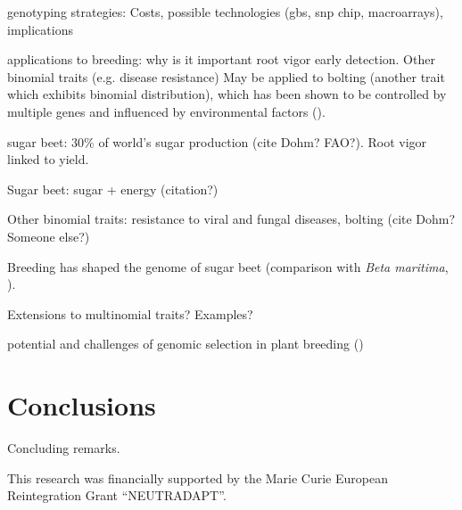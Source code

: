 genotyping strategies: 
Costs, possible technologies (gbs, snp chip, macroarrays), implications

applications to breeding:
why is it important root vigor early detection. Other binomial traits (e.g.
disease resistance) May be applied to bolting (another trait which
exhibits binomial distribution), which has been shown to be controlled
by multiple genes and influenced by environmental factors
(\cite{salah2012genetic}).

sugar beet: $30\%$ of world's sugar production (cite Dohm? FAO?). Root
vigor linked to yield.

Sugar beet: sugar + energy (citation?)

Other binomial traits: resistance to viral and fungal diseases, bolting
(cite Dohm? Someone else?)

Breeding has shaped the genome of sugar beet (comparison with \emph{Beta
  maritima}, \cite{dohm2013genome}).

Extensions to multinomial traits? Examples?

potential and challenges of genomic selection in plant breeding (\cite{jonas2013does})

%

\section{Conclusions}
\label{sec:conclusions}

Concluding remarks. 


\begin{acknowledgements}
This research was financially supported by the Marie Curie European
Reintegration Grant ``NEUTRADAPT''.
\end{acknowledgements}


